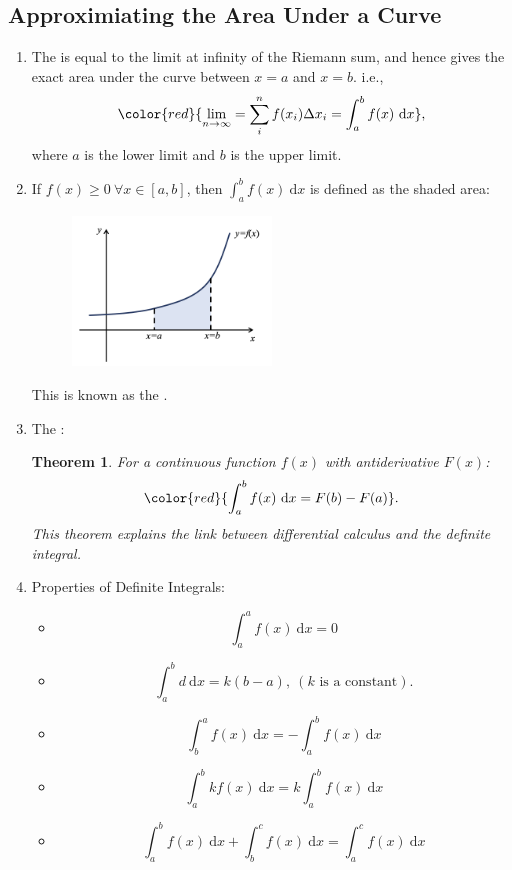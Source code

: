 \documentclass[12pt, a4paper]{article}
\newtheorem{theorem}{Theorem}[subsection]
\def\d{{\mathrm{d}}}
\begin{document}
\subsection{Approximiating the Area Under a Curve}
\begin{enumerate}
    \item The {\color{red}{definite integral}} is equal to the limit at infinity of the Riemann sum, and hence gives the exact area under the curve between $x=a$ and $x=b$. i.e., 
    $${\color{red}{\lim_{n\to\infty}=\sum_{i}^{n}f(x_i)\Delta x_i=\int_a^b f(x)\ \mathrm{d}x}}, $$
    where $a$ is the lower limit and $b$ is the upper limit. 
    \item If $f(x)\geq 0\ \forall x\in\left[a,b\right]$, then $\int_a^bf(x)\ \mathrm{d}x$ is defined as the shaded area: 
    \begin{figure}[H]
        \centering 
        \includegraphics[width=0.5\textwidth]{Fig.5.6.jpg} 
    \end{figure}
    This is known as the {\color{red}{Riemann integral}}.
    \item The {\color{red}{Fundamental Theorem of Calculus}}: 
    \begin{theorem}
        For a continuous function $f(x)$ with antiderivative $F(x)$: 
        $${\color{red}{\int_a^bf(x)\ \d x=F(b)-F(a)}}.$$
        This theorem explains the link between differential calculus and the definite integral. 
    \end{theorem}
    \item Properties of Definite Integrals: 
    \begin{itemize}
        \item $$\int_a^af(x)\ \d x=0$$
        \item $$\int_a^bd\ \d x=k(b-a),\ (k\text{ is a constant}).$$
        \item $$\int_b^af(x)\ \d x=-\int_a^bf(x)\ \d x$$
        \item $$\int_a^bkf(x)\ \d x=k\int_a^bf(x)\ \d x$$
        \item $$\int_a^bf(x)\ \d x+\int_b^cf(x)\ \d x=\int_a^cf(x)\ \d x$$

\end{itemize}
\end{enumerate}
\end{document}
